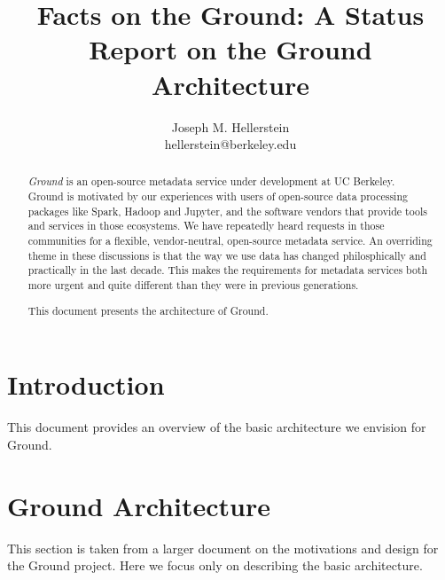 \documentclass{article}
\author{
Joseph M. Hellerstein\\
       {\scriptsize hellerstein@berkeley.edu}
}
\title{Facts on the Ground: A Status Report on the Ground Architecture}
\date{}
\begin{document}
\maketitle

\begin{abstract}
\emph{Ground} is an open-source metadata service under development at UC Berkeley.  Ground is motivated by our experiences with users of open-source data processing packages like Spark, Hadoop and Jupyter, and the software vendors that provide tools and services in those ecosystems.  We have repeatedly heard requests in those communities for a flexible, vendor-neutral, open-source metadata service.  An overriding theme in these discussions is that the way we use data has changed philosphically and practically  in the last decade.  This makes the requirements for metadata services both more urgent and quite different than they were in previous generations.

This document presents the architecture of Ground.
\end{abstract}

\section{Introduction}
This document provides an overview of the basic architecture we envision for Ground.  

\section{Ground Architecture}
This section is taken from a larger document on the motivations and design for the Ground project.  Here we focus only on describing the basic architecture.





\end{document}

